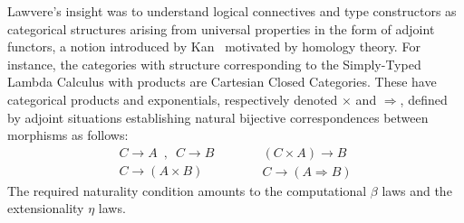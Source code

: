 \documentclass[11pt,twocolumn]{article}
\begin{document}
Lawvere's insight was to understand logical connectives and type
constructors as categorical structures arising from universal properties
in the form of adjoint functors, a notion introduced by Kan~\cite{Kan}
motivated by homology theory.  For instance, the categories with structure
corresponding to the Simply-Typed Lambda Calculus with products are
Cartesian Closed Categories.  These have categorical products and
exponentials, respectively denoted $\times$ and $\Rightarrow$, defined by
adjoint situations establishing natural bijective correspondences between
morphisms as follows:
  \[
  \begin{array}{c}
    C\to A \enspace,\enspace C\to B
    \\ \hline\hline
    C\to (A\times B)
  \end{array}
  \quad\qquad
  \begin{array}{c}
    (C\times A)\to B
    \\ \hline\hline
    C\to (A\Rightarrow B)
  \end{array}
\]
The required naturality condition amounts to the computational $\beta$
laws and the extensionality $\eta$ laws.
\end{document}
